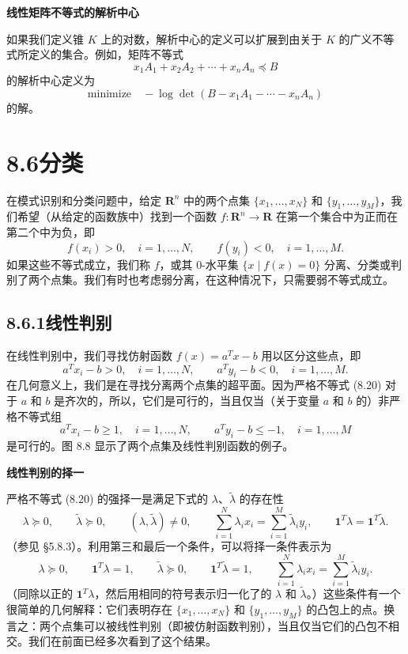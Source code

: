\documentclass[UTF8, 12pt, fontset=fandol, oneside]{ctexart}
\begin{document}
\noindent\textbf{线性矩阵不等式的解析中心}

如果我们定义锥 $K$ 上的对数，解析中心的定义可以扩展到由关于 $K$ 的广义不等式所定义的集合。例如，矩阵不等式
\[
x_1A_1+x_2A_2+\cdots+x_nA_n\preceq B
\]
的解析中心定义为
\[
\mbox{minimize}\quad -\log\det(B-x_1A_1-\cdots-x_nA_n)
\]
的解。

\section*{8.6\quad 分类}

在模式识别和分类问题中，给定 $\mathbf{R}^n$ 中的两个点集 $\{x_1,\ldots,x_N\}$ 和 $\{y_1,\ldots,y_M\}$，我们希望（从给定的函数族中）找到一个函数 $f:\mathbf{R}^n\to\mathbf{R}$ 在第一个集合中为正而在第二个中为负，即
\[
f(x_i)>0,\quad i=1,\ldots,N,\qquad f(y_i)<0,\quad i=1,\ldots,M.
\]
如果这些不等式成立，我们称 $f$，或其 0-水平集 $\{x\mid f(x)=0\}$ 分离、分类或判别了两个点集。我们有时也考虑弱分离，在这种情况下，只需要弱不等式成立。

\subsection*{8.6.1\quad 线性判别}

在线性判别中，我们寻找仿射函数 $f(x)=a^Tx-b$ 用以区分这些点，即
\[
a^Tx_i-b>0,\quad i=1,\ldots,N,\qquad a^Ty_i-b<0,\quad i=1,\ldots,M.
\tag{8.20}
\]
在几何意义上，我们是在寻找分离两个点集的超平面。因为严格不等式 (8.20) 对于 $a$ 和 $b$ 是齐次的，所以，它们是可行的，当且仅当（关于变量 $a$ 和 $b$ 的）非严格不等式组
\[
a^Tx_i-b\geq 1,\quad i=1,\ldots,N,\qquad a^Ty_i-b\leq -1,\quad i=1,\ldots,M
\tag{8.21}
\]
是可行的。图 8.8 显示了两个点集及线性判别函数的例子。

\noindent\textbf{线性判别的择一}

严格不等式 (8.20) 的强择一是满足下式的 $\lambda$、$\tilde\lambda$ 的存在性
\[
\lambda\succeq 0,\qquad \tilde\lambda\succeq 0,\qquad
(\lambda,\tilde\lambda)\neq 0,\qquad
\sum_{i=1}^N \lambda_i x_i=\sum_{i=1}^M \tilde\lambda_i y_i,\qquad
\mathbf{1}^T\lambda=\mathbf{1}^T\tilde\lambda.
\tag{8.22}
\]
（参见 \S 5.8.3）。利用第三和最后一个条件，可以将择一条件表示为
\[
\lambda\succeq 0,\qquad \mathbf{1}^T\lambda=1,\qquad
\tilde\lambda\succeq 0,\qquad \mathbf{1}^T\tilde\lambda=1,\qquad
\sum_{i=1}^N \lambda_i x_i=\sum_{i=1}^M \tilde\lambda_i y_i.
\]
（同除以正的 $\mathbf{1}^T\lambda$，然后用相同的符号表示归一化了的 $\lambda$ 和 $\tilde\lambda$。）这些条件有一个很简单的几何解释：它们表明存在 $\{x_1,\ldots,x_N\}$ 和 $\{y_1,\ldots,y_M\}$ 的凸包上的点。换言之：两个点集可以被线性判别（即被仿射函数判别），当且仅当它们的凸包不相交。我们在前面已经多次看到了这个结果。
\end{document}
